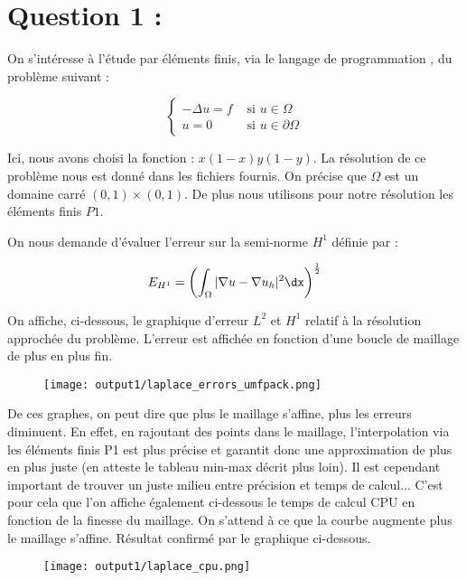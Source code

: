 \documentclass[11pt,a4paper]{report}
\begin{document}
	
	
		\section*{Question 1 :}
		
			On s'intéresse à l'étude par éléments finis, via le langage de programmation , du problème suivant : 
				
			\[
				\left\{
				\begin{array}{ll}
				- \Delta u = f & \mbox{ si } u \in \Omega \\
				u = 0 & \mbox{ si } u \in \partial\Omega
				\end{array}
				\right.
			\]
			
			Ici, nous avons choisi la fonction : $x(1-x)y(1-y)$. La résolution de ce problème nous est donné dans les fichiers fournis. On précise que $\Omega$ est un domaine carré $(0,1)\times(0,1)$. De plus nous utilisons pour notre résolution les éléments finis $P1$.
			
			On nous demande d'évaluer l'erreur sur la semi-norme $H^1$ définie par : 
			
			\[
				E_{H^1} = \displaystyle \left(\int_{\Omega} |\nabla u - \nabla u_h|^2 \dx \right)^{\frac{1}{2}}
			\]
		
		
			On affiche, ci-dessous, le graphique d'erreur $L^2$ et $H^1$ relatif à la résolution approchée du problème. L'erreur est affichée en fonction d'une boucle de maillage de plus en plus fin.
			
			\begin{figure}[H]
				\centering
				\texttt{[image: output1/laplace\_errors\_umfpack.png]}
			\end{figure}
		
			De ces graphes, on peut dire que plus le maillage s'affine, plus les erreurs diminuent. En effet, en rajoutant des points dans le maillage, l'interpolation via les éléments finis P1 est plus précise et garantit donc une approximation de plus en plus juste (en atteste le tableau min-max décrit plus loin). Il est cependant important de trouver un juste milieu entre précision et temps de calcul... C'est pour cela que l'on affiche également ci-dessous le temps de calcul CPU en fonction de la finesse du maillage. On s'attend à ce que la courbe augmente plus le maillage s'affine. Résultat confirmé par le graphique ci-dessous.
		
			\begin{figure}[H]
				\centering
				\texttt{[image: output1/laplace\_cpu.png]}
			\end{figure}
		
\end{document}
